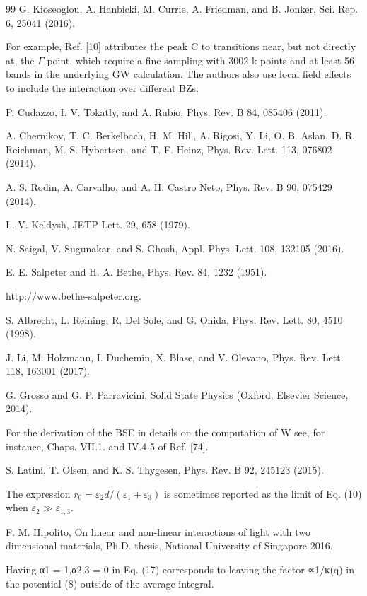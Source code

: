 \documentclass[11pt,a4paper]{ctexart}
\begin{document}
\begin{thebibliography}{99}
 G. Kioseoglou, A. Hanbicki, M. Currie, A. Friedman, and B. Jonker, Sci. Rep. 6, 25041 (2016).

 For example, Ref. [10] attributes the peak C to transitions near, but not directly at, the $\Gamma$ point, which require a fine sampling with 3002 k points and at least 56 bands in the underlying GW calculation. The authors also use local field effects to include the interaction over different BZs.

 P. Cudazzo, I. V. Tokatly, and A. Rubio, Phys. Rev. B 84, 085406 (2011).

 A. Chernikov, T. C. Berkelbach, H. M. Hill, A. Rigosi, Y. Li, O. B. Aslan, D. R. Reichman, M. S. Hybertsen, and T. F. Heinz, Phys. Rev. Lett. 113, 076802 (2014).

 A. S. Rodin, A. Carvalho, and A. H. Castro Neto, Phys. Rev. B 90, 075429 (2014).

 L. V. Keldysh, JETP Lett. 29, 658 (1979).

 N. Saigal, V. Sugunakar, and S. Ghosh, Appl. Phys. Lett. 108, 132105 (2016).

 E. E. Salpeter and H. A. Bethe, Phys. Rev. 84, 1232 (1951).

 http://www.bethe-salpeter.org.

 S. Albrecht, L. Reining, R. Del Sole, and G. Onida, Phys. Rev. Lett. 80, 4510 (1998).

 J. Li, M. Holzmann, I. Duchemin, X. Blase, and V. Olevano, Phys. Rev. Lett. 118, 163001 (2017).

 G. Grosso and G. P. Parravicini, Solid State Physics (Oxford, Elsevier Science, 2014).

 For the derivation of the BSE in details on the computation of W see, for instance, Chaps. VII.1. and IV.4-5 of Ref. [74].

 S. Latini, T. Olsen, and K. S. Thygesen, Phys. Rev. B 92, 245123 (2015).

 The expression $r_0=\varepsilon_2 d/(\varepsilon_1+\varepsilon_3)$ is sometimes reported as the limit of Eq. (10) when $\varepsilon_2\gg\varepsilon_{1,3}$.

 F. M. Hipolito, On linear and non-linear interactions of light with two dimensional materials, Ph.D. thesis, National University of Singapore 2016.

 Having α1 = 1,α2,3 = 0 in Eq. (17) corresponds to leaving the factor ∝1/κ(q) in the potential (8) outside of the average integral.


\end{thebibliography}
\end{document}
